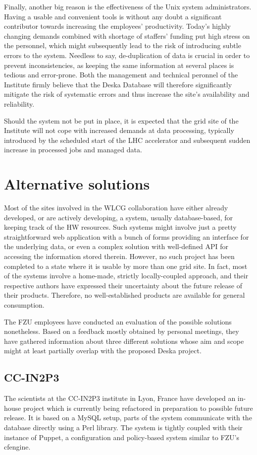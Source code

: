 \documentclass[12pt]{article}
\begin{document}
Finally, another big reason is the effectiveness of the Unix system administrators.  Having a usable and convenient tools is
without any doubt a significant contributor towards increasing the employees' productivity.  Today's highly changing demands
combined with shortage of staffers' funding put high stress on the personnel, which might subsequently lead to the risk of
introducing subtle errors to the system.  Needless to say, de-duplication of data is crucial in order to prevent inconsistencies,
as keeping the same information at several places is tedious and error-prone.  Both the management and technical peronnel of the
Institute firmly believe that the Deska Database will therefore significantly mitigate the risk of systematic errors and thus
increase the site's availability and reliability.

Should the system not be put in place, it is expected that the grid site of the Institute will not cope with increased demands at
data processing, typically introduced by the scheduled start of the LHC accelerator and subsequent sudden increase in processed
jobs and managed data.

\section{Alternative solutions}
Most of the sites involved in the WLCG collaboration have either already developed, or are actively developing, a system, usually
database-based, for keeping track of the HW resources.  Such systems might involve just a pretty straightforward web application
with a bunch of forms providing an interface for the underlying data, or even a complex solution with well-defined API for
accessing the information stored therein.  However, no such project has been completed to a state where it is usable by more than
one grid site.  In fact, most of the systems involve a home-made, strictly locally-coupled approach, and their respective authors
have expressed their uncertainty about the future release of their products.  Therefore, no well-established products are
available for general consumption.

The FZU employees have conducted an evaluation of the possible solutions nonetheless.  Based on a feedback mostly obtained by
personal meetings, they have gathered information about three different solutions whose aim and scope might at least partially
overlap with the proposed Deska project.

\subsection{CC-IN2P3}
The scientists at the CC-IN2P3 institute in Lyon, France have developed an in-house project which is currently being refactored in
preparation to possible future release.  It is based on a MySQL setup, parts of the system communicate with the database directly
using a Perl library.  The system is tightly coupled with their instance of Puppet, a configuration and policy-based system
similar to FZU's cfengine.
\end{document}
